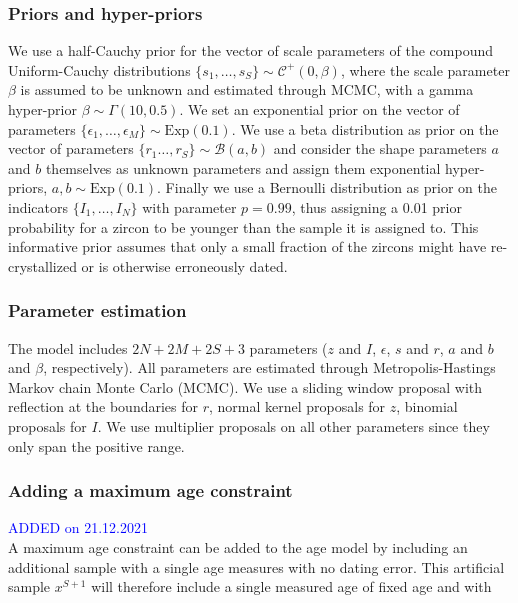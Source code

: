 \documentclass[12pt,letterpaper]{article}
\begin{document}
\subsubsection{Priors and hyper-priors}
We use a half-Cauchy prior for the vector of scale parameters of the compound Uniform-Cauchy distributions $\{s_1, \dots, s_S \} \sim \mathcal{C}^+(0, \beta)$, where the scale parameter $\beta$ is assumed to be unknown and estimated through MCMC, with a gamma hyper-prior $\beta \sim \Gamma(10, 0.5)$. 
We set an exponential prior on the vector of parameters $\{\epsilon_1, \dots, \epsilon_M \} \sim \text{Exp}(0.1)$.
We use a beta distribution as prior on the vector of parameters $\{r_1 \dots, r_S\} \sim \mathcal{B}(a, b)$ and consider the shape parameters $a$ and $b$ themselves as unknown parameters and assign them exponential hyper-priors, $a, b \sim \text{Exp}(0.1)$.
Finally we use a Bernoulli distribution as prior on the indicators $\{I_1, \dots, I_N\}$ with parameter $p = 0.99$, thus assigning a 0.01 prior probability for a zircon to be younger than the sample it is assigned to. This informative prior assumes that only a small fraction of the zircons might have re-crystallized or is otherwise erroneously dated. 

\subsubsection{Parameter estimation}
The model includes $2N + 2M + 2S + 3$ parameters ($z$ and $I$, $\epsilon$, $s$ and $r$, $a$ and $b$ and $\beta$, respectively). 
All parameters are estimated through Metropolis-Hastings Markov chain Monte Carlo (MCMC). We use a sliding window proposal with reflection at the boundaries for $r$, normal kernel proposals for $z$, binomial proposals for $I$. We use multiplier proposals on all other parameters since they only span the positive range. 


\subsubsection{Adding a maximum age constraint}
\textcolor{blue}{ADDED on 21.12.2021\\}
A maximum age constraint can be added to the age model by including an additional sample with a single age measures with no dating error. This artificial sample $x^{S+1}$ will therefore include a single measured age of fixed age and with 
\end{document}
